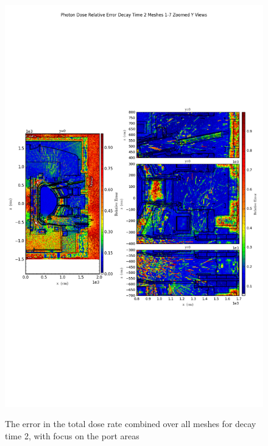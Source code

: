 \documentclass[12pt]{article}
\begin{document}
\begin{figure}[ht!]
\centering
\includegraphics[trim={0cm 9cm 0cm 10cm},clip,scale=0.75]{../plots/final_model_nob4c/Photon_Dose_Relative_Error_Decay_Time_2_Meshes_1-7_Zoomed_Y_Views.png}
\label{fig:photons_dc2_no4bc_total_error_zoomed}
\caption{The error in the total dose rate combined over all meshes for decay time 2, with focus on the port areas}
\end{figure}
\clearpage
\end{document}
